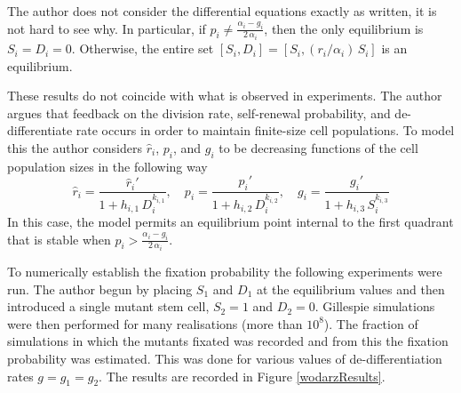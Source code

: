 \documentclass[12pt]{article}
\begin{document}
The author does not consider the differential equations exactly as written, it is not hard to see why. In particular, if $p_i\neq \frac{\alpha_i-g_i}{2\,\alpha_i}$, then the only equilibrium is $S_i=D_i=0$. Otherwise, the entire set $[S_i,D_i]=[S_i,(r_i/\alpha_i)\,S_i]$ is an equilibrium. 

These results do not coincide with what is observed in experiments. The author argues that feedback on the division rate, self-renewal probability, and de-differentiate rate occurs in order to maintain finite-size cell populations. To model this the author considers $\hat{r}_i$, $p_i$, and $g_i$ to be decreasing functions of the cell population sizes in the following way
\[
\hat{r}_i=\frac{\hat{r}_i'}{1+h_{i,1}\,D_i^{k_{i,1}}}, \quad p_i=\frac{p_i'}{1+h_{i,2}\,D_i^{k_{i,2}}}, \quad g_i=\frac{g_i'}{1+h_{i,3}\,S_i^{k_{i,3}}}
\]
In this case, the model permits an equilibrium point internal to the first quadrant that is stable when $p_i>\frac{\alpha_i-g_i}{2\,\alpha_i}$.

To numerically establish the fixation probability the following experiments were run. The author begun by placing $S_1$ and $D_1$ at the equilibrium values and then introduced a single mutant stem cell, $S_2=1$ and $D_2=0$. Gillespie simulations were then performed \cite{gillespie} for many realisations (more than $10^8$). The fraction of simulations in which the mutants fixated was recorded and from this the fixation probability was estimated. This was done for various values of de-differentiation rates $g=g_1=g_2$. The results are recorded in Figure \ref{wodarzResults}.
\end{document}

